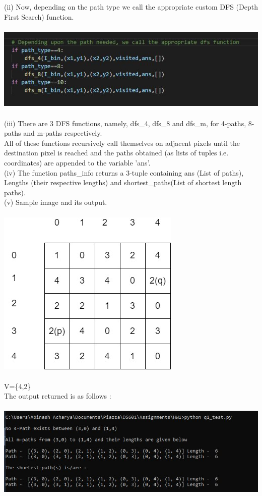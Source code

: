 \documentclass[12pt]{article}
\begin{document}
(ii) Now, depending on the path type we call the appropriate custom DFS (Depth First Search) function. \\ \\
\includegraphics[width=\linewidth]{DFS.JPG} \\ \\
(iii) There are 3 DFS functions, namely, dfs\_4, dfs\_8 and dfs\_m, for 4-paths, 8-paths and m-paths respectively. \\
All of these functions recursively call themselves on adjacent pixels until the destination pixel is reached and the paths obtained (as lists of tuples i.e. coordinates) are appended to the variable 'ans'.\\
(iv) The function paths\_info returns a 3-tuple containing ans (List of paths), Lengths (their respective lengths) and shortest\_paths(List of shortest length paths). \\
(v) Sample image and its output. \\ \\
\includegraphics[width=0.5\linewidth]{input.jpg} \\ \\
V=\{4,2\} \\ 
The output returned is as follows : \\ \\
\includegraphics[width=\linewidth]{Q1_sample_output.JPG} \\ \\
\end{document}
